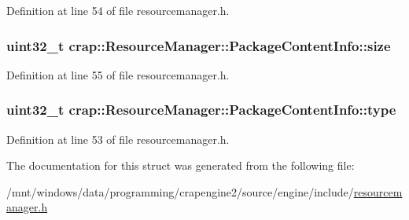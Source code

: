 Definition at line 54 of file resourcemanager.\+h.

\hypertarget{structcrap_1_1_resource_manager_1_1_package_content_info_a44623b6eae3303892db7cc79fbd1b29d}{}
\subsubsection[{size}]{\setlength{\rightskip}{0pt plus 5cm}uint32\+\_\+t crap\+::\+Resource\+Manager\+::\+Package\+Content\+Info\+::size}\label{structcrap_1_1_resource_manager_1_1_package_content_info_a44623b6eae3303892db7cc79fbd1b29d}


Definition at line 55 of file resourcemanager.\+h.

\hypertarget{structcrap_1_1_resource_manager_1_1_package_content_info_aa44d918f7f16824c05c04466d6823c26}{}
\subsubsection[{type}]{\setlength{\rightskip}{0pt plus 5cm}uint32\+\_\+t crap\+::\+Resource\+Manager\+::\+Package\+Content\+Info\+::type}\label{structcrap_1_1_resource_manager_1_1_package_content_info_aa44d918f7f16824c05c04466d6823c26}


Definition at line 53 of file resourcemanager.\+h.



The documentation for this struct was generated from the following file\+:\begin{DoxyCompactItemize}
\item 
/mnt/windows/data/programming/crapengine2/source/engine/include/\hyperlink{resourcemanager_8h}{resourcemanager.\+h}\end{DoxyCompactItemize}
